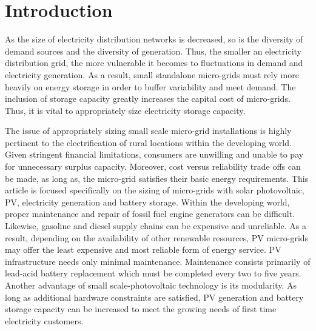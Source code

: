 \documentclass{article}
\begin{document}
\begin{abstract}

\end{abstract}

\section{Introduction}

As the size of electricity distribution networks is decreased, so is the diversity of demand sources and the diversity of generation.
Thus, the smaller an electricity distribution grid, the more vulnerable it becomes to fluctuations in demand and electricity generation.
As a result, small standalone micro-grids must rely more heavily on energy storage in order to buffer variability and meet demand.  
The inclusion of storage capacity greatly increases the capital cost of micro-grids.
Thus, it is vital to appropriately size electricity storage capacity.

The issue of appropriately sizing small scale micro-grid installations is highly pertinent to the electrification of rural locations within the developing world. 
Given stringent financial limitations, consumers are unwilling and unable to pay for unnecessary surplus capacity. 
Moreover, cost versus reliability trade offs can be made, as long as, the micro-grid satisfies their basic energy requirements. \cite{Marawanyika} 
This article is focused specifically on the sizing of micro-grids with solar photovoltaic, PV, electricity generation and battery storage. 
Within the developing world, proper maintenance and repair of fossil fuel engine generators can be difficult. 
Likewise, gasoline and diesel supply chains can be expensive and unreliable.  
As a result, depending on the availability of other renewable resources, PV micro-grids may offer the least expensive and most reliable form of energy service. \cite{Nouni,WB}
PV infrastructure needs only minimal maintenance.
Maintenance consists primarily of lead-acid battery replacement which must be completed every two to five years. 
Another advantage of small scale-photovoltaic technology is its modularity.  
As long as additional hardware constraints are satisfied, PV generation and battery storage capacity can be increased to meet the growing needs of first time electricity customers. \cite{Wamukonya}  
\end{document}

